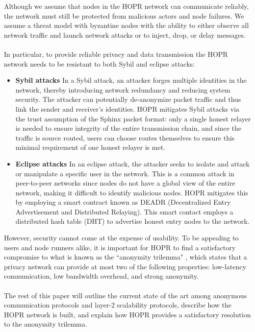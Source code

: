 Although we assume that nodes in the HOPR network can communicate reliably, the
network must still be protected from malicious actors and node failures. We assume a
threat model with byzantine nodes with the ability to either observe all network
traffic and launch network attacks or to inject, drop, or delay messages. \\~\\In particular, to provide reliable privacy and data transmission the HOPR network needs to be resistant to both Sybil and eclipse attacks:

\begin{itemize}
    \item \textbf{Sybil attacks} In a Sybil attack, an attacker forges
    multiple identities in the network, thereby introducing network redundancy and
    reducing system security. The attacker can potentially de-anonymize packet traffic and thus link the sender and receiver's identities. HOPR mitigates Sybil attacks via the trust assumption of the Sphinx packet format: only a single honest relayer is needed to ensure integrity of the entire transmission chain, and since the traffic is source routed, users can choose routes themselves to ensure this minimal requirement of one honest relayer is met. 
    \item \textbf{Eclipse attacks} In an eclipse attack, the attacker seeks to isolate and attack or
    manipulate a specific user in the network. This is a common
    attack in peer-to-peer networks since nodes do not have a global view of the entire network, making it difficult to identify
    malicious nodes. HOPR mitigates this by employing a smart contract known as DEADR (Decentralized Entry Advertisement and Distributed Relaying). This smart contact employs a distributed hash table (DHT) to advertise honest entry nodes to the network.
    
\end{itemize}
However, security cannot come at the expense of usability. To be appealing to users and node runners alike, it is important for HOPR to find a satisfactory compromise to what is known as the ``anonymity trilemma" \cite{AnonymityTrilemma}, which states that a privacy network can provide at most two of the following properties: low-latency
communication, low bandwidth overhead, and strong anonymity.
\\~\\The rest of this paper will outline the current state of the art among anonymous communication protocols and layer-2 scalability protocols, describe how the HOPR network is built, and explain how HOPR provides a satisfactory resolution to the anonymity trilemma. 

